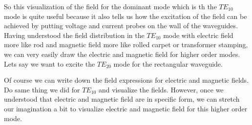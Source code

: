 So this visualization of the field for the dominant mode  which is th the $TE_{10}$ mode is quite useful because it also tells us how the excitation of the field can be achieved by putting voltage and current probes on the wall of the waveguides. Having understood the field distribution in the  $TE_{10}$ mode with electric field more like rod and magnetic field more like rolled carpet or transformer stamping, we can very easily draw the electric and magnetic field for higher order modes. Lets say we want to excite the $TE_{20}$ mode for the rectangular waveguide.

Of course we can write down the field expressions for electric and magnetic fields. Do same thing we did for $TE_{10}$ and visualize the fields. However, once we understood that electric and magnetic field are in specific form, we can stretch our imagination a bit to visualize electric and magnetic field for this higher order mode.

